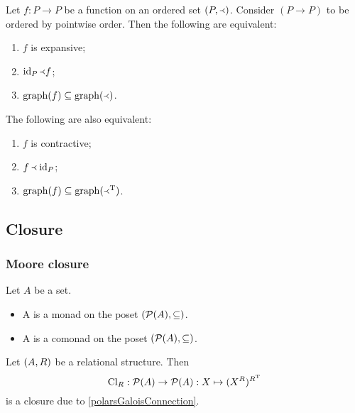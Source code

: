 \begin{lemma}
Let $f:P\to P$ be a function on an ordered set $(P,\Yleft)$. Consider $(P\to P)$ to be ordered by pointwise order. Then the following are equivalent:
\begin{enumerate}
\item $f$ is expansive;
\item $\operatorname{id}_P \Yleft f$;
\item $\operatorname{graph}(f) \subseteq \operatorname{graph}(\Yleft)$.
\end{enumerate}
The following are also equivalent:
\begin{enumerate}
\item $f$ is contractive;
\item $f \Yleft \operatorname{id}_P$;
\item $\operatorname{graph}(f) \subseteq \operatorname{graph}(\Yleft^{\mathrm{T}})$.
\end{enumerate}
\end{lemma}

\subsection{Closure}

\subsubsection{Moore closure}
\begin{definition}
Let $A$ be a set.
\begin{itemize}
\item A  is a monad on the poset $\left( \operatorname{\mathcal{P}}(A), \subseteq \right)$.
\item A  is a comonad on the poset $\left( \operatorname{\mathcal{P}}(A), \subseteq \right)$.
\end{itemize}
\end{definition}

\begin{example}
Let $\left( A,R \right)$ be a relational structure. Then
\[ \operatorname{Cl}_R: \operatorname{\mathcal{P}}(A) \to \operatorname{\mathcal{P}}(A): X \mapsto (X^{R})^{R^{\mathrm{T}}} \]
is a closure due to \ref{polarsGaloisConnection}.
\end{example}



